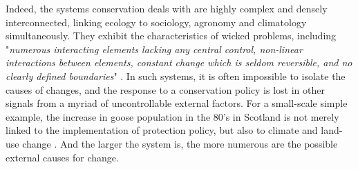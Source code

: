\documentclass[12pt,a4paper]{article}
\begin{document}
Indeed, the systems conservation deals with are highly complex and densely interconnected, linking ecology to sociology, agronomy and climatology simultaneously. %
They exhibit the characteristics of wicked problems, including "\textit{numerous interacting elements lacking any central control, non-linear interactions between elements, constant change which is seldom reversible, and no clearly defined boundaries}" \citep{game2013conservation}.
In such systems, it is often impossible to isolate the causes of changes, and the response to a conservation policy is lost in other signals from a myriad of uncontrollable external factors.
For a small-scale simple example, the increase in goose population in the 80's in Scotland is not merely linked to the implementation of protection policy, but also to climate and land-use change \citep{mason2017changing}.
And the larger the system is, the more numerous are the possible external causes for change.
\end{document}
